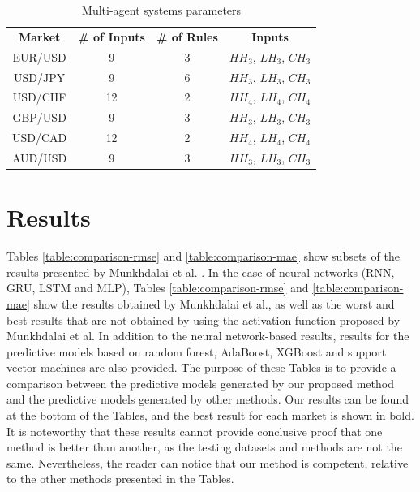 \documentclass{ieeeaccess}
\begin{document}
\begin{table}[]
  \caption{Multi-agent systems parameters}
  \small
  \centering
  \begin{tabular}{cccc}
    \textbf{Market} & \textbf{\# of Inputs} & \textbf{\# of Rules} & \textbf{Inputs} \\
    EUR/USD & 9 & 3 & $HH_3$, $LH_3$, $CH_3$ \\
    USD/JPY & 9 & 6 & $HH_3$, $LH_3$, $CH_3$ \\
    USD/CHF & 12 & 2 & $HH_4$, $LH_4$, $CH_4$ \\
    GBP/USD & 9 & 3 & $HH_3$, $LH_3$, $CH_3$ \\
    USD/CAD & 12 & 2 & $HH_4$, $LH_4$, $CH_4$ \\
    AUD/USD & 9 & 3 & $HH_3$, $LH_3$, $CH_3$ \\
  \end{tabular}
  \label{agents-parameters}
\end{table}

\section{Results}
\label{section:results}

Tables \ref{table:comparison-rmse} and \ref{table:comparison-mae} show
subsets of the results presented by Munkhdalai et
al. \cite{Munkhdalai2019}. In the case of neural networks (RNN, GRU,
LSTM and MLP), Tables \ref{table:comparison-rmse} and
\ref{table:comparison-mae} show the results obtained by Munkhdalai et
al., as well as the worst and best results that are not obtained by
using the activation function proposed by Munkhdalai et al. In
addition to the neural network-based results, results for the
predictive models based on random forest, AdaBoost, XGBoost and
support vector machines are also provided. The purpose of these Tables
is to provide a comparison between the predictive models generated by
our proposed method and the predictive models generated by other
methods. Our results can be found at the bottom of the Tables, and the
best result for each market is shown in bold. It is noteworthy that
these results cannot provide conclusive proof that one method is
better than another, as the testing datasets and methods are not the
same. Nevertheless, the reader can notice that our method is
competent, relative to the other methods presented in the Tables.
\end{document}

